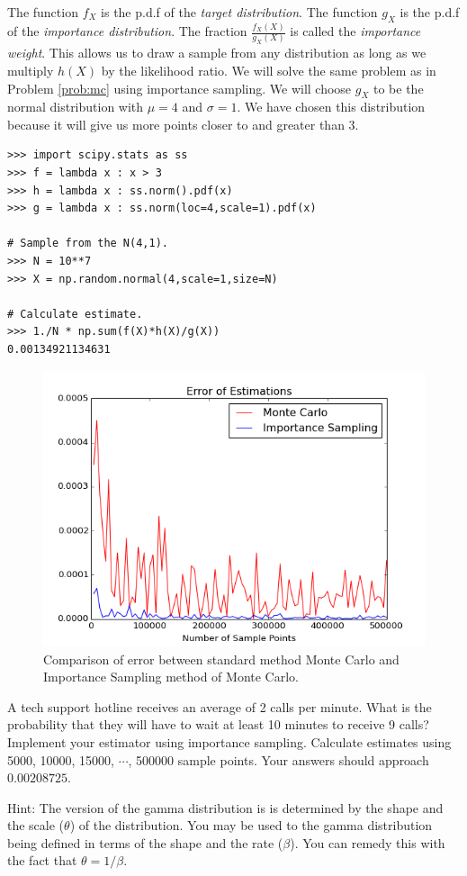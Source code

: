 The function $f_X$ is the p.d.f of the \emph{target distribution}. The function $g_X$ is the p.d.f of the \emph{importance distribution}. The fraction $\frac{f_X(X)}{g_X(X)}$ is called the \emph{importance weight}. This allows us to draw a sample from any distribution as long as we multiply $h(X)$ by the likelihood ratio. We will solve the same problem as in Problem \ref{prob:mc} using importance sampling. We will choose $g_X$ to be the normal distribution with $\mu = 4$ and $\sigma = 1$. We have chosen this distribution because it will give us more points closer to and greater than 3.

\begin{lstlisting}
>>> import scipy.stats as ss
>>> f = lambda x : x > 3
>>> h = lambda x : ss.norm().pdf(x)
>>> g = lambda x : ss.norm(loc=4,scale=1).pdf(x)

# Sample from the N(4,1).
>>> N = 10**7
>>> X = np.random.normal(4,scale=1,size=N)

# Calculate estimate.
>>> 1./N * np.sum(f(X)*h(X)/g(X))
0.00134921134631
\end{lstlisting}

\begin{figure}[H]
\includegraphics[width=\textwidth]{MCvsIS.png}
\caption{Comparison of error between standard method Monte Carlo and Importance Sampling method of Monte Carlo.}
\label{fig:compare}
\end{figure}

\begin{problem} \label{prob:gamma}
A tech support hotline receives an average of 2 calls per minute. What is the probability that they will have to wait at least 10 minutes to receive 9 calls? Implement your estimator using importance sampling. Calculate estimates using 5000, 10000, 15000, $\cdots$, 500000 sample points. Your answers should approach $0.00208725$.

Hint: The version of the gamma distribution is  is determined by the shape and the scale ($\theta$) of the distribution. You may be used to the gamma distribution being defined in terms of the shape and the rate ($\beta$). You can remedy this with the fact that $\theta = 1/\beta$.
\end{problem}


